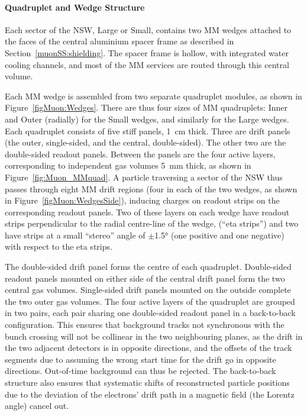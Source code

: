 \documentclass[cernpreprint, atlasdraft=false, UKenglish,british,orcidlogo, texmf, orcidlogo]{atlasdoc}
\begin{document}
 
 
\paragraph{ Quadruplet and Wedge Structure}
 
Each sector of the \gls{NSW}, Large or Small, contains two \gls{MM} wedges attached to the faces of the central aluminium spacer frame as described in Section~\ref{muonSS:shielding}. The spacer frame is hollow, with integrated water cooling channels, and most of the \gls{MM} services are routed through this central volume.
 
Each \gls{MM} wedge is assembled from two separate quadruplet modules, as shown in Figure~\ref{figMuon:Wedges}. There are thus four sizes of \gls{MM} quadruplets: Inner and Outer (radially) for the Small wedges, and similarly for the Large wedges.
Each quadruplet consists of five stiff panels, \SI{1}{\cm} thick.
Three are drift panels (the outer, single-sided, and the central, double-sided).
The other two are the double-sided readout panels.
Between the panels are the
four active layers, corresponding to independent gas volumes \SI{5}{\mm} thick, as shown in Figure~\ref{fig:Muon_MMquad}.
A particle traversing a sector of the \gls{NSW} thus passes through eight \gls{MM} drift regions (four in each of the two wedges, as shown in Figure~\ref{figMuon:WedgesSide}), inducing charges on readout strips on the corresponding readout panels. Two of these layers on each wedge have readout strips perpendicular to the radial centre-line of the wedge, (``eta strips'')
and two have strips at a small ``stereo'' angle of $\pm$\ang{1.5} (one positive and one negative) with respect to the eta strips.
 
The double-sided drift panel forms the centre of each quadruplet.
Double-sided readout panels mounted on either side of the central drift panel form the two central gas volumes.
Single-sided drift panels mounted on the outside complete the two outer gas volumes.
The four active layers of the quadruplet are grouped in two pairs, each pair sharing one double-sided readout panel in a back-to-back configuration.
This ensures that background tracks not synchronous with the bunch crossing will not be collinear in the two neighbouring planes, as the drift in the two adjacent detectors is in opposite directions, and the offsets of the track segments due to assuming the wrong start time for the drift go in opposite directions. Out-of-time background can thus be rejected. The back-to-back structure also ensures that systematic shifts of reconstructed particle positions due to the deviation of the electrons' drift path in a magnetic field (the Lorentz angle) cancel out.
 
\end{document}
